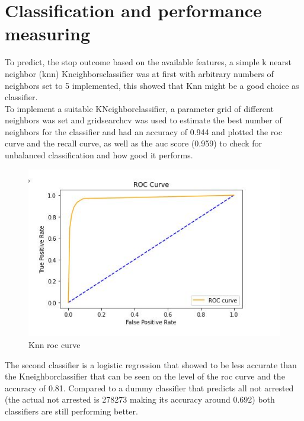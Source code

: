 \documentclass[doctype=studienarbeit,lang=english,BCOR=15mm,biblatex]{ldvbook}
\begin{document}
\section{Classification and performance measuring}
To predict, the stop outcome based on the available features, a simple k nearst neighbor (knn) Kneighborsclassifier was at first with arbitrary numbers of neighbors set to 5 implemented, this showed that Knn might be a good choice as classifier. \\
To implement a suitable KNeighborclassifier,  a parameter grid of different neighbors was set  and gridsearchcv was used to estimate the best number of neighbors for the classifier and had an accuracy of 0.944 and plotted the roc curve and the recall curve, as well as the auc score (0.959) to check for unbalanced classification and how good it performs. 
\begin{figure}[h]
    \centering
    \includegraphics{roc.JPG}
    \caption[[width=1.0\textwidth,height=50]{Knn roc curve}
    \label{fig:knnl}
\end{figure}


The second classifier is a logistic regression that showed to be less accurate than the Kneighborclassifier that can be seen on the level of the roc curve and the accuracy of 0.81.
Compared to a dummy classifier that predicts all not arrested (the actual not arrested is 278273 making its accuracy around 0.692) both classifiers are still performing better. 
\end{document}
